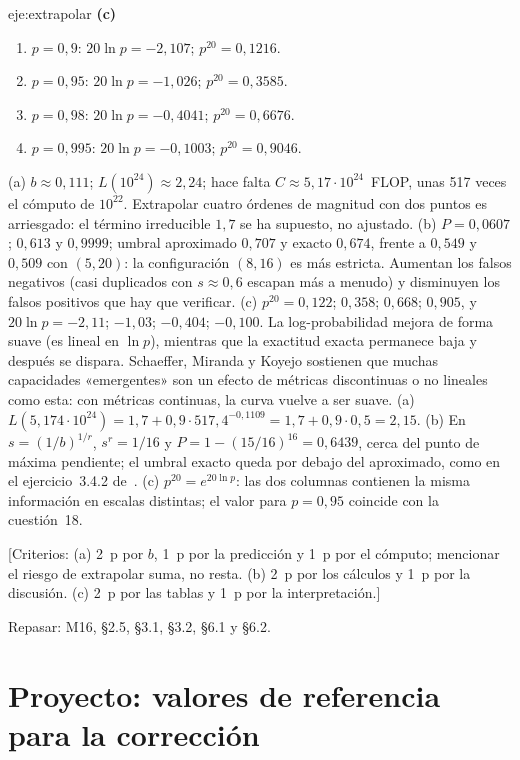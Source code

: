 \begin{solucion}{eje:extrapolar}
\noindent\textbf{(c)}
\begin{enumerate}[label=\arabic*.]
  \item $p=0{,}9$: $20\ln p=-2{,}107$; $p^{20}=0{,}1216$.
  \item $p=0{,}95$: $20\ln p=-1{,}026$; $p^{20}=0{,}3585$.
  \item $p=0{,}98$: $20\ln p=-0{,}4041$; $p^{20}=0{,}6676$.
  \item $p=0{,}995$: $20\ln p=-0{,}1003$; $p^{20}=0{,}9046$.
\end{enumerate}
\resultado (a) $b\approx 0{,}111$; $L(10^{24})\approx 2{,}24$; hace falta $C\approx 5{,}17\cdot 10^{24}$~FLOP, unas 517 veces el cómputo de $10^{22}$. Extrapolar cuatro órdenes de magnitud con dos puntos es arriesgado: el término irreducible $1{,}7$ se ha supuesto, no ajustado. (b) $P=0{,}0607$; $0{,}613$ y $0{,}9999$; umbral aproximado $0{,}707$ y exacto $0{,}674$, frente a $0{,}549$ y $0{,}509$ con $(5,20)$: la configuración $(8,16)$ es más estricta. Aumentan los falsos negativos (casi duplicados con $s\approx 0{,}6$ escapan más a menudo) y disminuyen los falsos positivos que hay que verificar. (c) $p^{20}=0{,}122$; $0{,}358$; $0{,}668$; $0{,}905$, y $20\ln p=-2{,}11$; $-1{,}03$; $-0{,}404$; $-0{,}100$. La log-probabilidad mejora de forma suave (es lineal en $\ln p$), mientras que la exactitud exacta permanece baja y después se dispara. Schaeffer, Miranda y Koyejo sostienen que muchas capacidades «emergentes» son un efecto de métricas discontinuas o no lineales como esta: con métricas continuas, la curva vuelve a ser suave.
\comprobacion (a) $L(5{,}174\cdot 10^{24})=1{,}7+0{,}9\cdot 517{,}4^{-0{,}1109}=1{,}7+0{,}9\cdot 0{,}5=2{,}15$. (b) En $s=(1/b)^{1/r}$, $s^{r}=1/16$ y $P=1-(15/16)^{16}=0{,}6439$, cerca del punto de máxima pendiente; el umbral exacto queda por debajo del aproximado, como en el ejercicio~3.4.2 de~\cite{mmds}. (c) $p^{20}=e^{20\ln p}$: las dos columnas contienen la misma información en escalas distintas; el valor para $p=0{,}95$ coincide con la cuestión~18.

[Criterios: (a) 2~p por $b$, 1~p por la predicción y 1~p por el cómputo; mencionar el riesgo de extrapolar suma, no resta. (b) 2~p por los cálculos y 1~p por la discusión. (c) 2~p por las tablas y 1~p por la interpretación.]

Repasar: M16, §2.5, §3.1, §3.2, §6.1 y §6.2.
\end{solucion}

\section{Proyecto: valores de referencia para la corrección}

